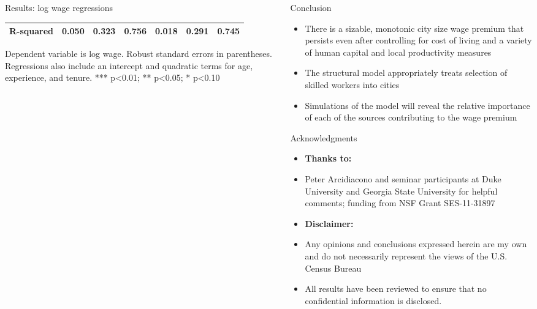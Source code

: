 \documentclass[english,final,t]{beamer}
\begin{document}
\begin{frame}{}
\begin{part}{}
\begin{columns}[t]
\begin{column}{.44\linewidth}
\begin{block}{Results: log wage regressions}
\begin{small}
\begin{center}
\begin{threeparttable}
\begin{tabular}{cccc|ccc}
			R-squared & 0.050 & 0.323 & 0.756 & 0.018 & 0.291 & 0.745 \\
			\hline
			\end{tabular}
			Dependent variable is log wage. Robust standard errors in parentheses. Regressions also include an intercept and quadratic terms for age, experience, and tenure.
			*** p<0.01;
			** p<0.05;
			* p<0.10
			\end{threeparttable}
			\end{center}
			\end{small}
      \end{block}
    \end{column}

    
    \begin{column}{.22\linewidth}

      \begin{block}{Conclusion}
        \begin{itemize}
				\item There is a sizable, monotonic city size wage premium that persists even after controlling for cost of living and a variety of human capital and local productivity measures
				\item The structural model appropriately treats selection of skilled workers into cities
				\item Simulations of the model will reveal the relative importance of each of the sources contributing to the wage premium
        \end{itemize}
        \vspace{3ex}
      \end{block}
			
      \vspace{-3ex}
      \begin{block}{Acknowledgments}
      \begin{scriptsize}
			\begin{itemize}
      \item[] \textbf{Thanks to:}
			\item Peter Arcidiacono and seminar participants at Duke University and Georgia State University for helpful comments; funding from NSF Grant SES-11-31897
			\end{itemize}
			\begin{itemize}
			\item[] \textbf{Disclaimer:}
			\item Any opinions and conclusions expressed herein are my own and do not necessarily represent the views of the U.S. Census Bureau
			\item All results have been reviewed to ensure that no confidential information is disclosed.
			\end{itemize}
      \end{scriptsize}
      \end{block}
			

\end{column}
\end{columns}
\end{part}
\end{frame}
\end{document}
